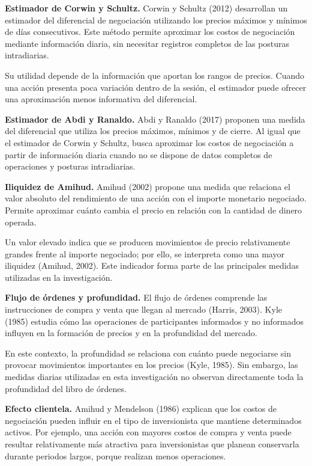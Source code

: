 \textbf{Estimador de Corwin y Schultz.} Corwin y Schultz (2012) desarrollan un estimador del diferencial de negociación utilizando los precios máximos y mínimos de días consecutivos. Este método permite aproximar los costos de negociación mediante información diaria, sin necesitar registros completos de las posturas intradiarias.

Su utilidad depende de la información que aportan los rangos de precios. Cuando una acción presenta poca variación dentro de la sesión, el estimador puede ofrecer una aproximación menos informativa del diferencial.

\textbf{Estimador de Abdi y Ranaldo.} Abdi y Ranaldo (2017) proponen una medida del diferencial que utiliza los precios máximos, mínimos y de cierre. Al igual que el estimador de Corwin y Schultz, busca aproximar los costos de negociación a partir de información diaria cuando no se dispone de datos completos de operaciones y posturas intradiarias.

\textbf{Iliquidez de Amihud.} Amihud (2002) propone una medida que relaciona el valor absoluto del rendimiento de una acción con el importe monetario negociado. Permite aproximar cuánto cambia el precio en relación con la cantidad de dinero operada.

Un valor elevado indica que se producen movimientos de precio relativamente grandes frente al importe negociado; por ello, se interpreta como una mayor iliquidez (Amihud, 2002). Este indicador forma parte de las principales medidas utilizadas en la investigación.

\textbf{Flujo de órdenes y profundidad.} El flujo de órdenes comprende las instrucciones de compra y venta que llegan al mercado (Harris, 2003). Kyle (1985) estudia cómo las operaciones de participantes informados y no informados influyen en la formación de precios y en la profundidad del mercado.

En este contexto, la profundidad se relaciona con cuánto puede negociarse sin provocar movimientos importantes en los precios (Kyle, 1985). Sin embargo, las medidas diarias utilizadas en esta investigación no observan directamente toda la profundidad del libro de órdenes.

\textbf{Efecto clientela.} Amihud y Mendelson (1986) explican que los costos de negociación pueden influir en el tipo de inversionista que mantiene determinados activos. Por ejemplo, una acción con mayores costos de compra y venta puede resultar relativamente más atractiva para inversionistas que planean conservarla durante periodos largos, porque realizan menos operaciones.

